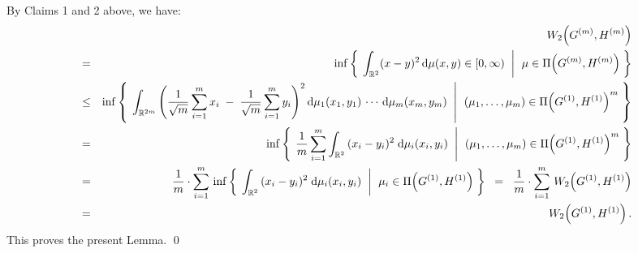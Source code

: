 \vskip 1.0cm
\noindent
By Claims 1 and 2 above, we have:
\begin{eqnarray*}
&&
	W_{2}\!\left(G^{(m)},H^{(m)}\right)
\\
& = &
	\inf\left\{\; \left. \int_{\mathbb{R}^{2}}(x - y)^{2}\,\textnormal{d}\mu(x,y) \in [0,\infty) \;\;\right\vert\;\, \mu \in \Pi\!\left(G^{(m)},H^{(m)}\right) \;\right\}
\\
&\leq&
	\inf\left\{\; \left.
	\int_{\mathbb{R}^{2m}}\left(\dfrac{1}{\sqrt{m}}\sum_{i=1}^{m}x_{i} \;-\; \dfrac{1}{\sqrt{m}}\sum_{i=1}^{m}y_{i}\right)^{2}
	\textnormal{d}\mu_{1}(x_{1},y_{1})\,\cdots\,\textnormal{d}\mu_{m}(x_{m},y_{m})
	\;\;\right\vert\;\,
	(\mu_{1},\ldots,\mu_{m}) \in \Pi\!\left(G^{(1)},H^{(1)}\right)^{m}
	\;\right\}
\\
&=&
	\inf\left\{\; \left.
	\dfrac{1}{m}\sum_{i=1}^{m}\int_{\mathbb{R}^{2}}\,(x_{i}-y_{i})^{2}\;\textnormal{d}\mu_{i}(x_{i},y_{i})	
	\;\;\right\vert\;\,
	(\mu_{1},\ldots,\mu_{m}) \in \Pi\!\left(G^{(1)},H^{(1)}\right)^{m}
	\;\right\}
\\
&=&
	\dfrac{1}{m}\cdot\sum_{i=1}^{m}\,
	\inf\left\{\; \left.
	\int_{\mathbb{R}^{2}}\,(x_{i}-y_{i})^{2}\;\textnormal{d}\mu_{i}(x_{i},y_{i})	
	\;\;\right\vert\;\,
	\mu_{i} \in \Pi\!\left(G^{(1)},H^{(1)}\right)
	\;\right\}
\;\;=\;\;
	\dfrac{1}{m}\cdot\sum_{i=1}^{m} \, W_{2}\!\left(G^{(1)},H^{(1)}\right)
\\
&=&
	W_{2}\!\left(G^{(1)},H^{(1)}\right).
\end{eqnarray*}
This proves the present Lemma.
\qed

